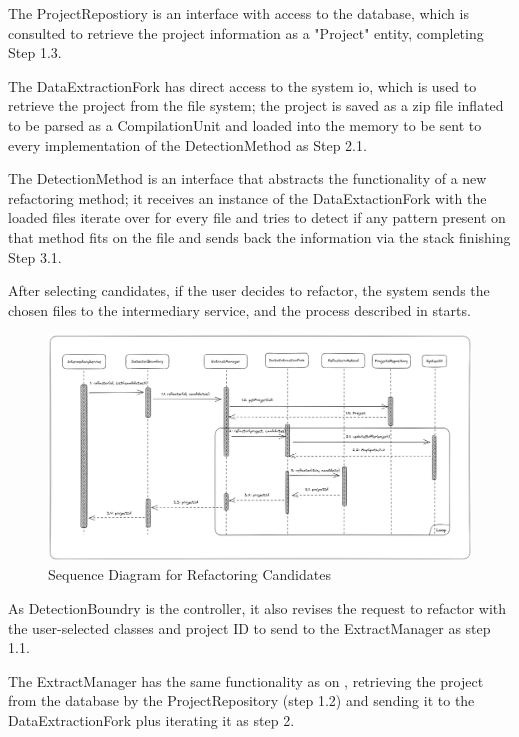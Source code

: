 The ProjectRepostiory is an interface with access to the database, which is consulted to retrieve the project information as a "Project" entity, completing Step 1.3.

The DataExtractionFork has direct access to the system io, which is used to retrieve the project from the file system; the project is saved as a zip file inflated to be parsed as a CompilationUnit and loaded into the memory to be sent to every implementation of the DetectionMethod as Step 2.1.

The DetectionMethod is an interface that abstracts the functionality of a new refactoring method; it receives an instance of the DataExtactionFork with the loaded files iterate over for every file and tries to detect if any pattern present on that method fits on the file and sends back the information via the stack finishing Step 3.1.

After selecting candidates, if the user decides to refactor, the system sends the chosen files to the intermediary service, and the process described in  starts.

\begin{figure}[ht!]
\SetCaptionWidth{\textwidth}
\caption{Sequence Diagram for Refactoring Candidates}
\label{fig-refactoring}
\includegraphics[width=160mm]{Chapter-2/Figures/refactoring.png}
\end{figure}
\FloatBarrier

As DetectionBoundry is the controller, it also revises the request to refactor with the user-selected classes and project ID to send to the ExtractManager as step 1.1.

The ExtractManager has the same functionality as on , retrieving the project from the database by the ProjectRepository (step 1.2) and sending it to the DataExtractionFork plus iterating it as step 2.

